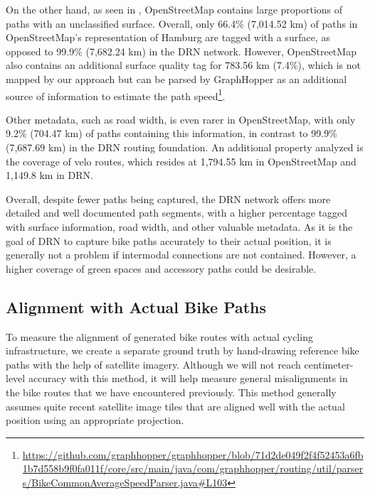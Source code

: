 On the other hand, as seen in , OpenStreetMap contains large proportions of paths with an unclassified surface. Overall, only 66.4\% (7,014.52 km) of paths in OpenStreetMap's representation of Hamburg are tagged with a surface, as opposed to 99.9\% (7,682.24 km) in the DRN network. However, OpenStreetMap also contains an additional surface quality tag for 783.56 km (7.4\%), which is not mapped by our approach but can be parsed by GraphHopper as an additional source of information to estimate the path speed\footnote{\url{https://github.com/graphhopper/graphhopper/blob/71d2de049f2f4f52453a6fb1b7d558b9f0fa011f/core/src/main/java/com/graphhopper/routing/util/parsers/BikeCommonAverageSpeedParser.java\#L103}}. 

Other metadata, such as road width, is even rarer in OpenStreetMap, with only 9.2\% (704.47 km) of paths containing this information, in contrast to 99.9\% (7,687.69 km) in the DRN routing foundation. An additional property analyzed is the coverage of velo routes, which resides at 1,794.55 km in OpenStreetMap and 1,149.8 km in DRN.

Overall, despite fewer paths being captured, the DRN network offers more detailed and well documented path segments, with a higher percentage tagged with surface information, road width, and other valuable metadata. As it is the goal of DRN to capture bike paths accurately to their actual position, it is generally not a problem if intermodal connections are not contained. However, a higher coverage of green spaces and accessory paths could be desirable. 

\subsection{Alignment with Actual Bike Paths}\label{sec:routing-alignment}

To measure the alignment of generated bike routes with actual cycling infrastructure, we create a separate ground truth by hand-drawing reference bike paths with the help of satellite imagery. Although we will not reach centimeter-level accuracy with this method, it will help measure general misalignments in the bike routes that we have encountered previously. This method generally assumes quite recent satellite image tiles that are aligned well with the actual position using an appropriate projection.

